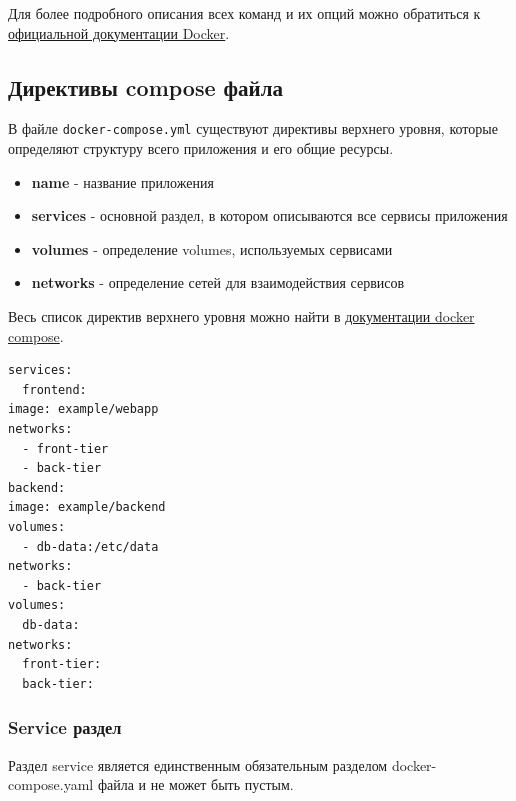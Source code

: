 \documentclass[12pt,a4paper]{article}
\begin{document}
Для более подробного описания всех команд и их опций можно обратиться к \href{https://docs.docker.com/reference/cli/docker/compose/}{официальной документации Docker}.

\subsection{Директивы compose файла}

В файле \texttt{docker-compose.yml} существуют директивы верхнего уровня, которые определяют структуру всего приложения и его общие ресурсы.

\begin{itemize}
    \item \textbf{name} - название приложения
    \item \textbf{services} - основной раздел, в котором описываются все сервисы приложения
    \item \textbf{volumes} - определение volumes, используемых сервисами
    \item \textbf{networks} - определение сетей для взаимодействия сервисов
\end{itemize}

Весь список директив верхнего уровня можно найти в \href{https://docs.docker.com/reference/compose-file/}{документации docker compose}.

\vspace{0.2cm}

\begin{lstlisting}[language=docker-compose-2, caption={Пример определения мультиконтейнерного приложения в \mbox{docker-compose.yaml}}, numbers=none, frame=single, basicstyle=\ttfamily\footnotesize, columns=fullflexible, keepspaces=true, breaklines=false, commentstyle=\color{gray}\itshape, extendedchars=true, texcl=true, showstringspaces=false]
services:
  frontend:
image: example/webapp
networks:
  - front-tier
  - back-tier
backend:
image: example/backend
volumes:
  - db-data:/etc/data
networks:
  - back-tier
volumes:
  db-data:
networks:
  front-tier:
  back-tier:
\end{lstlisting}

\subsubsection{Service раздел}
Раздел service является единственным обязательным разделом docker-compose.yaml файла и не может быть пустым.
\end{document}
